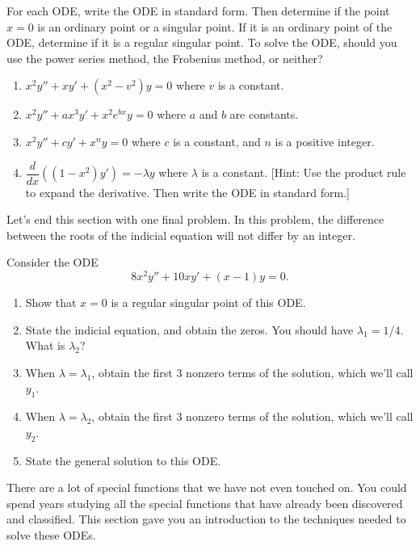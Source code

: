 \begin{problem}
 For each ODE, write the ODE in standard form.  Then determine if the point $x=0$ is an ordinary point or a singular point.  If it is an ordinary point of the ODE, determine if it is a regular singular point. To solve the ODE, should you use the power series method, the Frobenius method, or neither?
\begin{enumerate}
 \item $x^2y''+xy'+(x^2-v^2)y=0$ where $v$ is a constant.
 \item $x^2y''+ax^3y'+x^2e^{bx}y=0$ where $a$ and $b$ are constants.
 \item $x^2y''+cy'+x^ny=0$ where $c$ is a constant, and $n$ is a positive integer. 
 \item $\dfrac{d}{dx}\left((1-x^2)y'\right)=-\lambda y$ where $\lambda$ is a constant. [Hint: Use the product rule to expand the derivative. Then write the ODE in standard form.]
\end{enumerate}
\end{problem}

Let's end this section with one final problem. In this problem, the difference between the roots of the indicial equation will not differ by an integer. 
\begin{problem}
 Consider the ODE $$8x^2y''+10xy'+(x-1)y=0.$$
\begin{enumerate}
 \item Show that $x=0$ is a regular singular point of this ODE.
 \item State the indicial equation, and obtain the zeros.  You should have $\lambda_1=1/4$.  What is $\lambda_2$?
 \item  {}%
When $\lambda=\lambda_1$, obtain the first 3 nonzero terms of the solution, which we'll call $y_1$. 
 \item When $\lambda=\lambda_2$, obtain the first 3 nonzero terms of the solution, which we'll call $y_2$. 
 \item State the general solution to this ODE. 
\end{enumerate}

\end{problem}
 
There are a lot of special functions that we have not even touched on.  You could spend years studying all the special functions that have already been discovered and classified.  This section gave you an introduction to the techniques needed to solve these ODEs.

